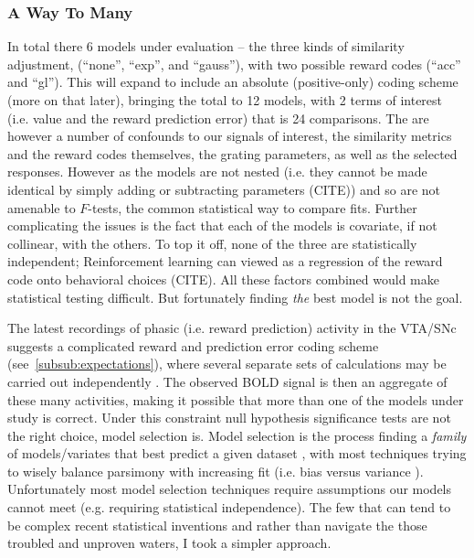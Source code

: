 \documentclass[doc,12pt]{apa}        %
\begin{document}
\subsubsection{A Way To Many}
\label{subsub:tomany}
In total there 6 models under evaluation -- the three kinds of similarity adjustment, (``none'', ``exp'', and ``gauss''), with two possible reward codes (``acc'' and ``gl'').  This will expand to include an absolute (positive-only) coding scheme (more on that later), bringing the total to 12 models, with 2 terms of interest (i.e. value and the reward prediction error) that is 24 comparisons.  The are however a number of confounds to our signals of interest, the similarity metrics and the reward codes themselves, the grating parameters, as well as the selected responses.  However as the models are not nested (i.e. they cannot be made identical by simply adding or subtracting parameters (CITE)) and so are not amenable to $F$-tests, the common statistical way to compare fits.  Further complicating the issues is the fact that each of the models is covariate, if not collinear, with the others.  To top it off, none of the three are statistically independent; Reinforcement learning can viewed as a regression of the reward code onto behavioral choices (CITE).  All these factors combined would make statistical testing difficult.  But fortunately finding \emph{the} best model is not the goal.  

The latest recordings of phasic (i.e. reward prediction) activity in the VTA/SNc suggests a complicated reward and prediction error coding scheme (see~\ref{subsub:expectations}), where several separate sets of calculations may be carried out independently \cite{Kim:2006p1063, Matsumoto:2009p7219, Smith:2011p8133}.  The observed BOLD signal is then an aggregate of these many activities, making it possible that more than one of the models under study is correct.  Under this constraint null hypothesis significance tests are not the right choice, model selection is.  Model selection is the process finding a \emph{family} of models/variates that best predict a given dataset \cite{Rao:2001p9457}, with most techniques trying to wisely balance parsimony with increasing fit (i.e. bias versus variance \cite{Geman:1p9469}).  Unfortunately most model selection techniques require assumptions our models cannot meet (e.g. requiring statistical independence).  The few that can tend to be complex recent statistical inventions and rather than navigate the those troubled and unproven waters, I took a simpler approach.  
\end{document}
